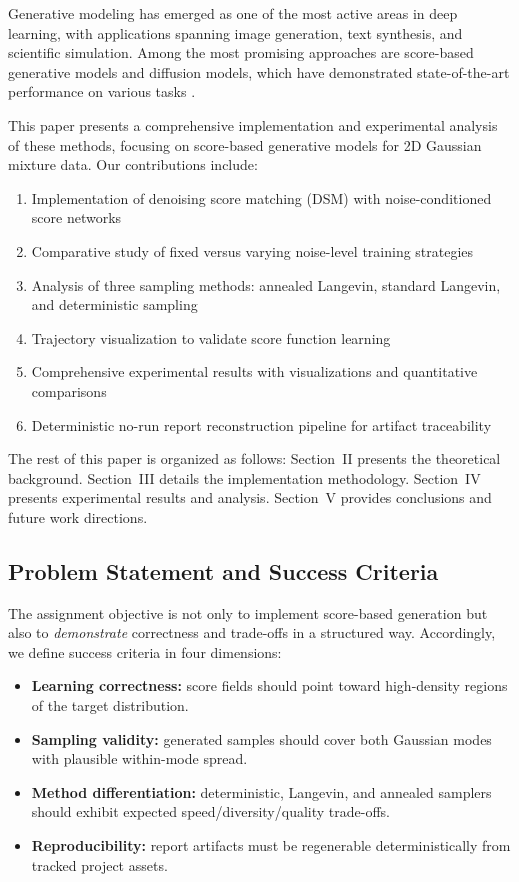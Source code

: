\documentclass[journal]{IEEEtran}
\begin{document}
Generative modeling has emerged as one of the most active areas in deep learning, with applications spanning image generation, text synthesis, and scientific simulation. Among the most promising approaches are score-based generative models and diffusion models, which have demonstrated state-of-the-art performance on various tasks \cite{song2021score, ho2020denoising}.

This paper presents a comprehensive implementation and experimental analysis of these methods, focusing on score-based generative models for 2D Gaussian mixture data. Our contributions include:

\begin{enumerate}
    \item Implementation of denoising score matching (DSM) with noise-conditioned score networks
    \item Comparative study of fixed versus varying noise-level training strategies
    \item Analysis of three sampling methods: annealed Langevin, standard Langevin, and deterministic sampling
    \item Trajectory visualization to validate score function learning
    \item Comprehensive experimental results with visualizations and quantitative comparisons
    \item Deterministic no-run report reconstruction pipeline for artifact traceability
\end{enumerate}

The rest of this paper is organized as follows: Section~II presents the theoretical background. Section~III details the implementation methodology. Section~IV presents experimental results and analysis. Section~V provides conclusions and future work directions.

\subsection{Problem Statement and Success Criteria}

The assignment objective is not only to implement score-based generation but also to \textit{demonstrate} correctness and trade-offs in a structured way. Accordingly, we define success criteria in four dimensions:
\begin{itemize}
    \item \textbf{Learning correctness:} score fields should point toward high-density regions of the target distribution.
    \item \textbf{Sampling validity:} generated samples should cover both Gaussian modes with plausible within-mode spread.
    \item \textbf{Method differentiation:} deterministic, Langevin, and annealed samplers should exhibit expected speed/diversity/quality trade-offs.
    \item \textbf{Reproducibility:} report artifacts must be regenerable deterministically from tracked project assets.
\end{itemize}
\end{document}
